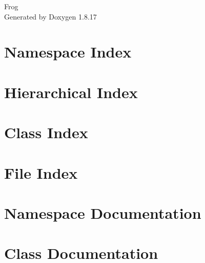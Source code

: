 \let\mypdfximage\pdfximage\def\pdfximage{\immediate\mypdfximage}\documentclass[twoside]{book}
\newcommand{\+}{\discretionary{\mbox{\scriptsize$\hookleftarrow$}}{}{}}
\newcommand{\clearemptydoublepage}{%
  \newpage{\pagestyle{empty}\cleardoublepage}%
}
\begin{document}
\hypersetup{pageanchor=false,
             bookmarksnumbered=true,
             pdfencoding=unicode
            }
\begin{titlepage}
\vspace*{7cm}
\begin{center}%
{\Large Frog }\\
\vspace*{1cm}
{\large Generated by Doxygen 1.8.17}\\
\end{center}
\end{titlepage}
\clearemptydoublepage
{}
\tableofcontents
\clearemptydoublepage
{}
\hypersetup{pageanchor=true}

\chapter{Namespace Index}

\chapter{Hierarchical Index}

\chapter{Class Index}

\chapter{File Index}

\chapter{Namespace Documentation}





\chapter{Class Documentation}



































\end{document}
